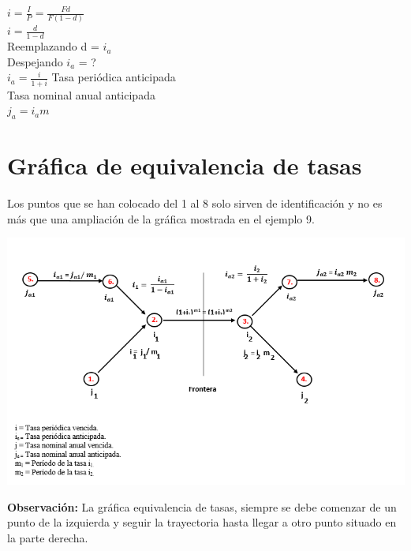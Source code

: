 $i = \frac{I}{P} = \frac{F d}{F(1-d)}$\\

$i = \frac{d}{1-d}$\\

Reemplazando d = $i_{a}$\\

Despejando $i_{a}$ = ?\\

$i_{a} = \frac{i}{1+i}$  Tasa periódica anticipada\\

Tasa nominal anual anticipada\\

$j_{a} = i_{a}  m$\\


\section{Gráfica de equivalencia de tasas}

Los puntos que se han colocado del 1 al 8 solo sirven de identificación y no es más que una ampliación de la gráfica mostrada en el ejemplo 9.\\

\begin{center}
	\includegraphics[height = 9.0 cm]{general}\\
\end{center}


\textbf{Observación:} La gráfica equivalencia de tasas, siempre se debe comenzar de un punto de la izquierda y seguir la trayectoria hasta llegar a otro punto situado en la parte derecha.\\

